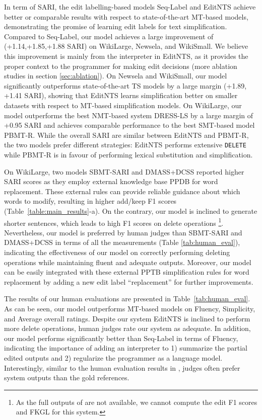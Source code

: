 \documentclass[11pt,a4paper]{article}
\def\delete{{\texttt{DELETE}}}
\def\seqlabel{Seq-Label}
\def\seqlabels{Seq-Label }
\def\wikilarge{WikiLarge}
\def\wikismall{WikiSmall}
\def\newsela{Newsela}
\def\editnet{EditNTS}
\begin{document}
In term of SARI, the edit labelling-based models \seqlabels and \editnet{} achieve better or comparable results with respect to state-of-the-art MT-based models, demonstrating the promise of learning edit labels for text simplification. Compared to \seqlabel, our model achieves a large improvement of (+1.14,+1.85,+1.88 SARI) on \wikilarge, \newsela, and \wikismall. We believe this improvement is mainly from the interpreter in \editnet, as it provides the proper context to the programmer for making edit decisions (more ablation studies in section \ref{sec:ablation}). On Newsela and \wikismall{}, our model significantly outperforms  state-of-the-art TS models by a large margin (+1.89, +1.41 SARI), showing that  \editnet{} learns simplification better on smaller datasets with respect to MT-based simplification models. On \wikilarge{}, our model outperforms  the best NMT-based system DRESS-LS by a large margin of +0.95 SARI and achieves comparable performance to the best SMT-based model PBMT-R. While the overall SARI are similar between \editnet{} and PBMT-R,  the two models prefer different strategies: \editnet{} performs extensive \delete{} while PBMT-R is in favour of performing lexical substitution and simplification. 

On \wikilarge, two models SBMT-SARI and DMASS+DCSS reported higher SARI scores as they employ external knowledge base PPDB for word replacement. These external rules can provide reliable
guidance about which words to modify, resulting in higher add/keep F1 scores (Table~\ref{table:main_results}-a). On the contrary, our model is inclined to generate shorter sentences, which leads to high F1 scores on delete operations \footnote{As the full outputs of  are not available, we cannot compute the edit F1 scores and FKGL for this system.}. Nevertheless, our model is preferred by human judges than SBMT-SARI and DMASS+DCSS in terms of all the measurements (Table \ref{tab:human_eval}), indicating the effectiveness of our model on correctly performing deleting operations while maintaining fluent and adequate outputs.  Moreover, our model can be easily integrated with these external PPTB simplification rules for word replacement by adding a new edit label ``replacement'' for further improvements.



The results of our human evaluations are presented in Table~\ref{tab:human_eval}. As can be seen, our model outperforms MT-based models on Fluency, Simplicity, and Average overall ratings. Despite our system \editnet{} is inclined to perform more delete operations, human judges rate our system as adequate. In addition, our model performs significantly better than \seqlabels in terms of Fluency, indicating the importance of adding an interpreter to 1) summarize the partial edited outputs and 2) regularize the programmer as a language model. Interestingly, similar to the human evaluation results in \citet{zhang2017sentence}, judges often prefer system outputs than the gold references.
 
\end{document}
